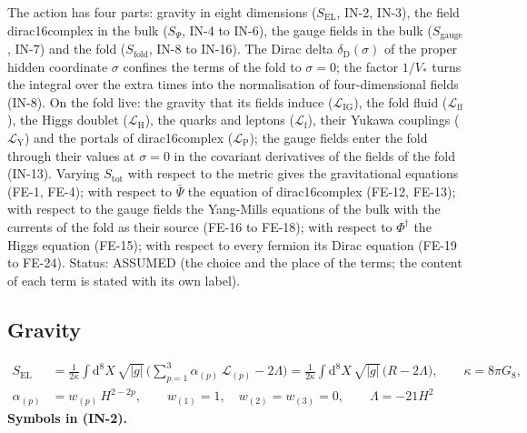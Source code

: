 \documentclass[
  10pt,
]{article}
\begin{document}
The action has four parts: gravity in eight dimensions
(\(S_{\mathrm{EL}}\), IN-2, IN-3), the field dirac16complex in the bulk
(\(S_\Psi\), IN-4 to IN-6), the gauge fields in the bulk
(\(S_{\mathrm{gauge}}\), IN-7) and the fold (\(S_{\mathrm{fold}}\), IN-8
to IN-16). The Dirac delta \(\delta_{\mathrm{D}}(\sigma)\) of the proper
hidden coordinate \(\sigma\) confines the terms of the fold to
\(\sigma = 0\); the factor \(1/V_*\) turns the integral over the extra
times into the normalisation of four-dimensional fields (IN-8). On the
fold live: the gravity that its fields induce
(\(\mathcal{L}_{\mathrm{IG}}\)), the fold fluid
(\(\mathcal{L}_{\mathrm{ff}}\)), the Higgs doublet
(\(\mathcal{L}_{\mathrm{H}}\)), the quarks and leptons
(\(\mathcal{L}_{\mathrm{f}}\)), their Yukawa couplings
(\(\mathcal{L}_{\mathrm{Y}}\)) and the portals of dirac16complex
(\(\mathcal{L}_{\mathrm{P}}\)); the gauge fields enter the fold through
their values at \(\sigma = 0\) in the covariant derivatives of the
fields of the fold (IN-13). Varying \(S_{\mathrm{tot}}\) with respect to
the metric gives the gravitational equations (FE-1, FE-4); with respect
to \(\bar\Psi\) the equation of dirac16complex (FE-12, FE-13); with
respect to the gauge fields the Yang-Mills equations of the bulk with
the currents of the fold as their source (FE-16 to FE-18); with respect
to \(\Phi^\dagger\) the Higgs equation (FE-15); with respect to every
fermion its Dirac equation (FE-19 to FE-24). Status: ASSUMED (the choice
and the place of the terms; the content of each term is stated with its
own label).

\hypertarget{gravity}{%
\subsection{Gravity}\label{gravity}}

\[
\begin{aligned}
S_{\mathrm{EL}} &= \frac{1}{2\kappa}\int\mathrm{d}^8X\,\sqrt{\lvert g\rvert}\,\Big(\sum_{p=1}^{3}\alpha_{(p)}\,\mathcal{L}_{(p)}
 - 2\Lambda\Big) = \frac{1}{2\kappa}\int\mathrm{d}^8X\,\sqrt{\lvert g\rvert}\,\big(R - 2\Lambda\big),\qquad \kappa = 8\pi G_8,\\
\alpha_{(p)} &= w_{(p)}\,H^{2-2p},\qquad w_{(1)} = 1,\quad w_{(2)} = w_{(3)} = 0,\qquad \Lambda = -21H^2
\end{aligned} \tag{IN-2}
\] \textbf{Symbols in (IN-2).}
\end{document}

